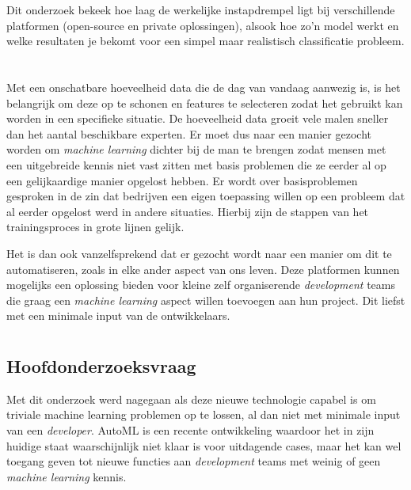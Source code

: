 Dit onderzoek bekeek hoe laag de werkelijke instapdrempel ligt bij verschillende platformen (open-source en private oplossingen), alsook hoe zo'n model werkt en welke resultaten je bekomt voor een simpel maar realistisch classificatie probleem.

\section{}
\label{sec:probleemstelling}

Met een onschatbare hoeveelheid data die de dag van vandaag aanwezig is, is het belangrijk om deze op te schonen en features te selecteren zodat het gebruikt kan worden in een specifieke situatie. De hoeveelheid data groeit vele malen sneller dan het aantal beschikbare experten. Er moet dus naar een manier gezocht worden om \textit{machine learning} dichter bij de man te brengen zodat mensen met een uitgebreide kennis niet vast zitten met basis problemen die ze eerder al op een gelijkaardige manier opgelost hebben. Er wordt over basisproblemen gesproken in de zin dat bedrijven een eigen toepassing willen op een probleem dat al eerder opgelost werd in andere situaties. Hierbij zijn de stappen van het trainingsproces in grote lijnen gelijk.

Het is dan ook vanzelfsprekend dat er gezocht wordt naar een manier om dit te automatiseren, zoals in elke ander aspect van ons leven. Deze platformen kunnen mogelijks een oplossing bieden voor kleine zelf organiserende \textit{development} teams die graag een \textit{machine learning} aspect willen toevoegen aan hun project. Dit liefst met een minimale input van de ontwikkelaars.

\section{}
\label{sec:onderzoeksvraag}

\subsection{Hoofdonderzoeksvraag}
\label{subsec:hoofdonderzoeksvraag}

Met dit onderzoek werd nagegaan als deze nieuwe technologie capabel is om triviale machine learning problemen op te lossen, al dan niet met minimale input van een \textit{developer}. AutoML is een recente ontwikkeling waardoor het in zijn huidige staat waarschijnlijk niet klaar is voor uitdagende cases, maar het kan wel toegang geven tot nieuwe functies aan \textit{development} teams met weinig of geen \textit{machine learning} kennis.

